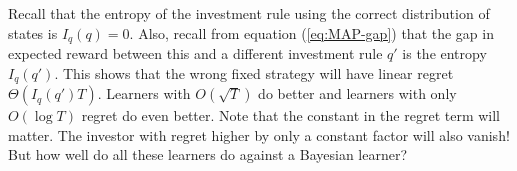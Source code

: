 Recall that the entropy of the investment rule using the correct distribution of states is $I_q(q)=0$. 
Also, recall from equation (\ref{eq:MAP-gap}) that the gap in expected reward between this and a different investment rule $q'$ is the entropy $I_q(q')$. This shows that the wrong fixed strategy will have linear regret $\Theta(I_q(q')T)$. 
Learners with $O(\sqrt{T})$ do better and learners with only $O(\log T)$ regret do even better. Note that the constant in the regret term will matter. The investor with regret higher by only a constant factor will also vanish! But how well do all these learners do against a Bayesian learner?
